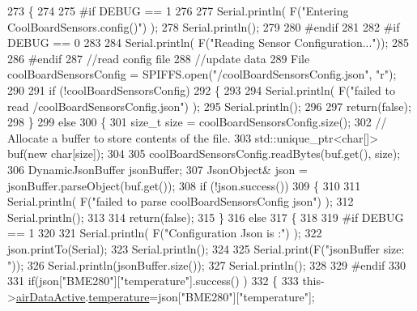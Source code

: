 \begin{DoxyCode}
273 \{
274 
275 \textcolor{preprocessor}{#if DEBUG == 1}
276 
277     Serial.println( F(\textcolor{stringliteral}{"Entering CoolBoardSensors.config()"}) );
278     Serial.println();
279 
280 \textcolor{preprocessor}{#endif}
281 
282 \textcolor{preprocessor}{#if DEBUG == 0}
283 
284     Serial.println( F(\textcolor{stringliteral}{"Reading Sensor Configuration..."}));
285 
286 \textcolor{preprocessor}{#endif}
287     \textcolor{comment}{//read config file}
288     \textcolor{comment}{//update data}
289     File coolBoardSensorsConfig = SPIFFS.open(\textcolor{stringliteral}{"/coolBoardSensorsConfig.json"}, \textcolor{stringliteral}{"r"});
290 
291     \textcolor{keywordflow}{if} (!coolBoardSensorsConfig) 
292     \{
293     
294         Serial.println( F(\textcolor{stringliteral}{"failed to read /coolBoardSensorsConfig.json"}) );
295         Serial.println();
296 
297         \textcolor{keywordflow}{return}(\textcolor{keyword}{false});
298     \}
299     \textcolor{keywordflow}{else}
300     \{
301         \textcolor{keywordtype}{size\_t} size = coolBoardSensorsConfig.size();
302         \textcolor{comment}{// Allocate a buffer to store contents of the file.}
303         std::unique\_ptr<char[]> buf(\textcolor{keyword}{new} \textcolor{keywordtype}{char}[size]);
304 
305         coolBoardSensorsConfig.readBytes(buf.get(), size);
306         DynamicJsonBuffer jsonBuffer;
307         JsonObject& json = jsonBuffer.parseObject(buf.get());
308         \textcolor{keywordflow}{if} (!json.success()) 
309         \{
310 
311             Serial.println( F(\textcolor{stringliteral}{"failed to parse coolBoardSensorsConfig json"}) );
312             Serial.println();
313     
314             \textcolor{keywordflow}{return}(\textcolor{keyword}{false});
315         \} 
316         \textcolor{keywordflow}{else}
317         \{
318 
319 \textcolor{preprocessor}{        #if DEBUG == 1}
320 
321             Serial.println( F(\textcolor{stringliteral}{"Configuration Json is :"}) );
322             json.printTo(Serial);
323             Serial.println();
324 
325             Serial.print(F(\textcolor{stringliteral}{"jsonBuffer size: "}));
326             Serial.println(jsonBuffer.size());
327             Serial.println();
328         
329 \textcolor{preprocessor}{        #endif}
330             
331             \textcolor{keywordflow}{if}(json[\textcolor{stringliteral}{"BME280"}][\textcolor{stringliteral}{"temperature"}].success() )
332             \{           
333                 this->\hyperlink{class_cool_board_sensors_abff8dfeccb2f7689847bb64d5f1cd31e}{airDataActive}.\hyperlink{struct_cool_board_sensors_1_1air_active_ac08576736c7ac3bfbfec32e5ee17c686}{temperature}=json[\textcolor{stringliteral}{"BME280"}][\textcolor{stringliteral}{"temperature"}];

\end{DoxyCode}
